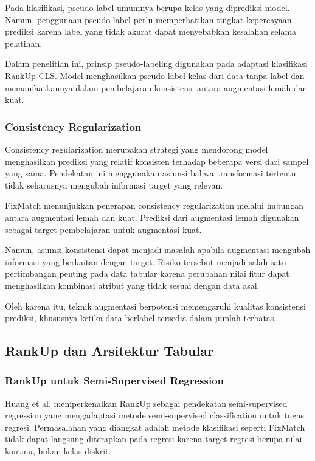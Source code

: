 Pada klasifikasi, pseudo-label umumnya berupa kelas yang diprediksi model. Namun, penggunaan pseudo-label perlu memperhatikan tingkat kepercayaan prediksi karena label yang tidak akurat dapat menyebabkan kesalahan selama pelatihan.

Dalam penelitian ini, prinsip pseudo-labeling digunakan pada adaptasi klasifikasi RankUp-CLS. Model menghasilkan pseudo-label kelas dari data tanpa label dan memanfaatkannya dalam pembelajaran konsistensi antara augmentasi lemah dan kuat.

\subsubsection{Consistency Regularization}

Consistency regularization merupakan strategi yang mendorong model menghasilkan prediksi yang relatif konsisten terhadap beberapa versi dari sampel yang sama. Pendekatan ini menggunakan asumsi bahwa transformasi tertentu tidak seharusnya mengubah informasi target yang relevan.

FixMatch \cite{ref9} menunjukkan penerapan consistency regularization melalui hubungan antara augmentasi lemah dan kuat. Prediksi dari augmentasi lemah digunakan sebagai target pembelajaran untuk augmentasi kuat.

Namun, asumsi konsistensi dapat menjadi masalah apabila augmentasi mengubah informasi yang berkaitan dengan target. Risiko tersebut menjadi salah satu pertimbangan penting pada data tabular karena perubahan nilai fitur dapat menghasilkan kombinasi atribut yang tidak sesuai dengan data asal.

Oleh karena itu, teknik augmentasi berpotensi memengaruhi kualitas konsistensi prediksi, khususnya ketika data berlabel tersedia dalam jumlah terbatas.

\subsection{RankUp dan Arsitektur Tabular}

\subsubsection{RankUp untuk Semi-Supervised Regression}

Huang et al. \cite{ref10} memperkenalkan RankUp sebagai pendekatan semi-supervised regression yang mengadaptasi metode semi-supervised classification untuk tugas regresi. Permasalahan yang diangkat adalah metode klasifikasi seperti FixMatch tidak dapat langsung diterapkan pada regresi karena target regresi berupa nilai kontinu, bukan kelas diskrit.

